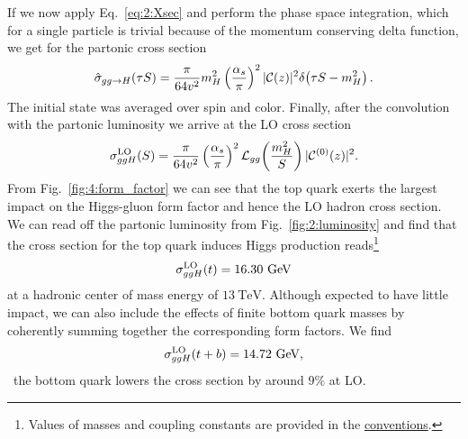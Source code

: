 If we now apply Eq.~\eqref{eq:2:Xsec} and perform the phase space integration, which for a single particle is trivial because of the momentum conserving delta function, we get for the partonic cross section
\begin{equation}
\hat{\sigma}_{gg \rightarrow H}(\tau S) = \frac{\pi}{64 v^2} m_H^2 \left( \frac{\alpha_s}{\pi} \right)^2 |\mathcal{C}(z)|^2 \delta\! \left(\tau S - m_H^2 \right).
\end{equation}
The initial state was averaged over spin and color. Finally, after the convolution with the partonic luminosity we arrive at the LO cross section
\begin{equation}
\sigma_{ggH}^{\text{LO}}(S) = \frac{\pi}{64v^2} \left(\frac{\alpha_s}{\pi} \right)^2 \mathcal{L}_{gg}\!\left(\frac{m_H^2}{S} \right) |\mathcal{C}^{(0)}(z)|^2.
\end{equation}
From Fig.~\ref{fig:4:form_factor} we can see that the top quark exerts the largest impact on the Higgs-gluon form factor and hence the \acs{LO} hadron cross section. We can read off the partonic luminosity from Fig.~\ref{fig:2:luminosity} and find that the cross section for the top quark induces Higgs production reads\footnote{Values of masses and coupling constants are provided in the \hyperref[chap:notation_and_conventions]{conventions}.}
\begin{equation}
\sigma_{ggH}^{\text{LO}} (t) = 16.30\ \GeV
\end{equation}
at a hadronic center of mass energy of $13\ \text{TeV}$. Although expected to have little impact, we can also include the effects of finite bottom quark masses by coherently summing together the corresponding form factors. We find
\begin{equation}
\sigma_{ggH}^{\text{LO}}(t+b) = 14.72\ \GeV,
\end{equation}
\ie\ the bottom quark lowers the cross section by around $9\%$ at \acs{LO}.

